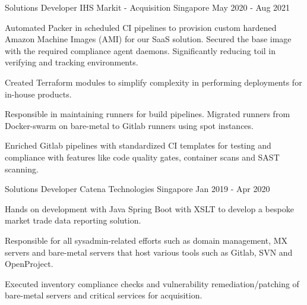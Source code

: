 \begin{cventries}

  \cventry
  {Solutions Developer} %
  {IHS Markit - Acquisition} %
  {Singapore} %
  {May 2020 - Aug 2021} %
  {
    \begin{cvitems} %
      \item {Automated  Packer in scheduled CI pipelines to provision custom hardened Amazon Machine Images (AMI) for our SaaS solution. Secured the base image with the required compliance agent daemons. Significantly reducing toil in verifying and tracking environments.}
      \item {Created Terraform modules to simplify complexity in performing deployments for in-house products.}
      \item {Responsible in maintaining runners for build pipelines. Migrated runners from Docker-swarm on bare-metal to Gitlab runners using spot instances.}
      \item {Enriched Gitlab pipelines with standardized CI templates for testing and compliance with features like code quality gates, container scans and SAST scanning.}
    \end{cvitems}
  }



  \cventry
  {Solutions Developer} %
  {Catena Technologies} %
  {Singapore} %
  {Jan 2019 - Apr 2020} %
  {
    \begin{cvitems} %
      \item {Hands on development with Java Spring Boot with XSLT to develop a bespoke market trade data reporting solution.}
      \item {Responsible for all sysadmin-related efforts such as domain management, MX servers and bare-metal servers that host various tools such as Gitlab, SVN and OpenProject.}
      \item {Executed inventory compliance checks and vulnerability remediation/patching of bare-metal servers and critical services for acquisition.}
    \end{cvitems}
  }

\end{cventries}
